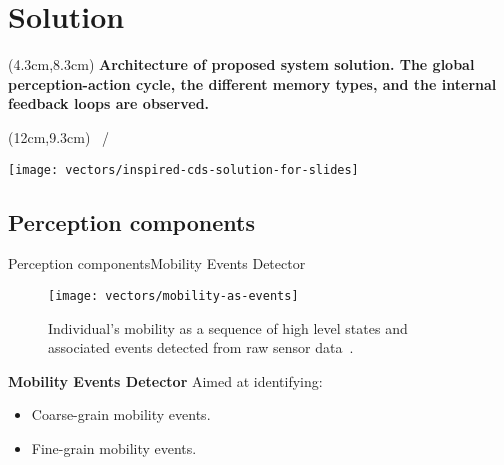 \section{Solution}
{\aauwavesbg%
\begin{frame}[plain]
  \begin{textblock*}{8.5cm}(4.3cm,8.3cm)
  \small
  \textbf{Architecture of proposed system solution. The global perception-action cycle, the different memory types, and the internal feedback loops are observed.}
  \end{textblock*}

  \begin{textblock*}{1cm}(12cm,9.3cm)
  \scriptsize
  \insertframenumber~/~\inserttotalframenumber
  \end{textblock*}

  \centering
  \texttt{[image: vectors/inspired-cds-solution-for-slides]}
\end{frame}}
    

\subsection{Perception components}
\begin{frame}{Perception components}{Mobility Events Detector}
\small
\begin{figure}
    \texttt{[image: vectors/mobility-as-events]}
    \caption{Individual's mobility as a sequence of high level states and associated events detected from raw sensor data~\cite{Alessandretti2017,Wang2014}.}
\end{figure}

\begin{block}{\small \textbf{Mobility Events Detector}} 
Aimed at identifying:
\begin{itemize}
    \item Coarse-grain mobility events.
    \item Fine-grain mobility events.
\end{itemize}
\end{block}
\end{frame}

